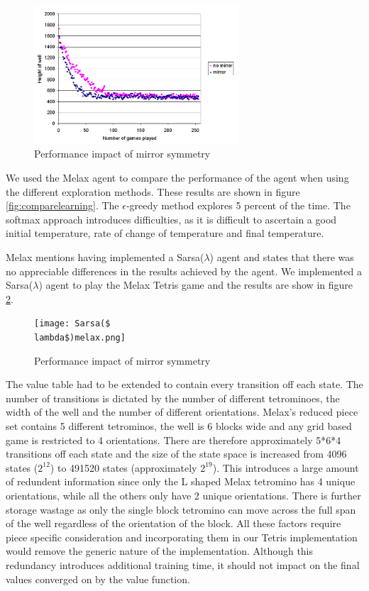 \documentclass{rucsthesis}
\begin{document}
\begin{figure}[h]
\centering
\includegraphics[width=3in]{mirrormelax.png}
\caption{Performance impact of mirror symmetry}
\label{fig:comparemelax}
\end{figure}

We used the Melax agent to compare the performance of the agent when using the different exploration methods. These results are shown in figure \ref{fig:comparelearning}. The $\epsilon$-greedy method explores 5 percent of the time. The softmax approach introduces difficulties, as it is difficult to ascertain a good initial temperature, rate of change of temperature and final temperature.

Melax mentions having implemented a Sarsa($\lambda$) agent and states that there was no appreciable differences in the results achieved by the agent. We implemented a Sarsa($\lambda$) agent to play the Melax Tetris game and the results are show in figure \ref{fig:melaxSarsa($\lambda$)}.

\begin{figure}[h]
\centering
\texttt{[image: Sarsa(\$\\lambda\$)melax.png]}
\caption{Performance impact of mirror symmetry}
\label{fig:melaxSarsa($\lambda$)}
\end{figure} 

The value table had to be extended to contain every transition off each state. The number of transitions is dictated by the number of different tetrominoes, the width of the well and the number of different orientations. Melax's reduced piece set contains 5 different tetrominos, the well is 6 blocks wide and any grid based game is restricted to 4 orientations. There are therefore approximately 5*6*4 transitions off each state and the size of the state space is increased from 4096 states ($2^{12}$) to 491520 states (approximately $2^{19}$). This introduces a large amount of redundent information since only the L shaped Melax tetromino has 4 unique orientations, while all the others only have 2 unique orientations. There is further storage wastage as only the single block tetromino can move across the full span of the well regardless of the orientation of the block. All these factors require piece specific consideration and incorporating them in our Tetris implementation would remove the generic nature of the implementation. Although this redundancy introduces additional training time, it should not impact on the final values converged on by the value function.
\end{document}
